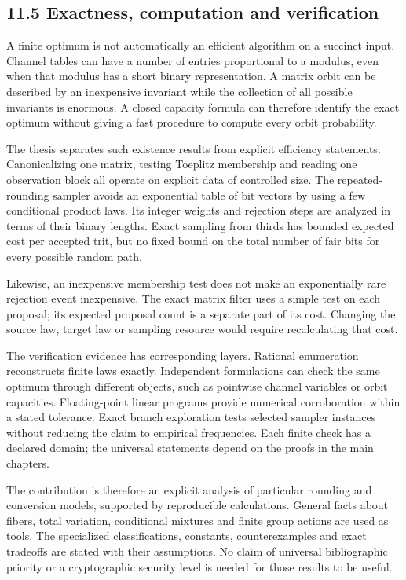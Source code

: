 \documentclass[
]{article}
\begin{document}
\subsection{11.5 Exactness, computation and
verification}\label{exactness-computation-and-verification}

A finite optimum is not automatically an efficient algorithm on a
succinct input. Channel tables can have a number of entries proportional
to a modulus, even when that modulus has a short binary representation.
A matrix orbit can be described by an inexpensive invariant while the
collection of all possible invariants is enormous. A closed capacity
formula can therefore identify the exact optimum without giving a fast
procedure to compute every orbit probability.

The thesis separates such existence results from explicit efficiency
statements. Canonicalizing one matrix, testing Toeplitz membership and
reading one observation block all operate on explicit data of controlled
size. The repeated-rounding sampler avoids an exponential table of bit
vectors by using a few conditional product laws. Its integer weights and
rejection steps are analyzed in terms of their binary lengths. Exact
sampling from thirds has bounded expected cost per accepted trit, but no
fixed bound on the total number of fair bits for every possible random
path.

Likewise, an inexpensive membership test does not make an exponentially
rare rejection event inexpensive. The exact matrix filter uses a simple
test on each proposal; its expected proposal count is a separate part of
its cost. Changing the source law, target law or sampling resource would
require recalculating that cost.

The verification evidence has corresponding layers. Rational enumeration
reconstructs finite laws exactly. Independent formulations can check the
same optimum through different objects, such as pointwise channel
variables or orbit capacities. Floating-point linear programs provide
numerical corroboration within a stated tolerance. Exact branch
exploration tests selected sampler instances without reducing the claim
to empirical frequencies. Each finite check has a declared domain; the
universal statements depend on the proofs in the main chapters.

The contribution is therefore an explicit analysis of particular
rounding and conversion models, supported by reproducible calculations.
General facts about fibers, total variation, conditional mixtures and
finite group actions are used as tools. The specialized classifications,
constants, counterexamples and exact tradeoffs are stated with their
assumptions. No claim of universal bibliographic priority or a
cryptographic security level is needed for those results to be useful.
\end{document}
